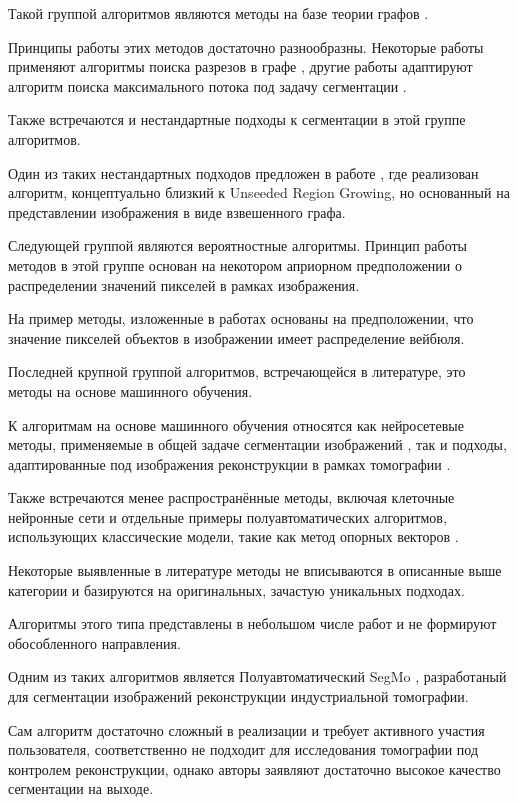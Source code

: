 Такой группой алгоритмов являются методы на базе теории графов \cite{camilus2012review}. 

Принципы работы этих методов достаточно разнообразны. Некоторые работы применяют алгоритмы поиска разрезов в графе \cite{boykov2003computing, peng2019interactive}, другие работы адаптируют алгоритм поиска максимального потока под задачу сегментации \cite{zeng2008topology}.

Также встречаются и нестандартные подходы к сегментации в этой группе алгоритмов.

Один из таких нестандартных подходов предложен в работе \cite{felzenszwalb2004efficient}, где реализован алгоритм, концептуально близкий к Unseeded Region Growing, но основанный на представлении изображения в виде взвешенного графа.

Следующей группой являются вероятностные алгоритмы. Принцип работы методов в этой группе основан на некотором априорном предположении о распределении значений пикселей в рамках изображения.

На пример методы, изложенные в работах \cite{hu2003volumetric, ayed2006unsupervised} основаны на предположении, что значение пикселей объектов в  изображении имеет распределение вейбюля.

Последней крупной группой алгоритмов, встречающейся в литературе, это методы на основе машинного обучения.

К алгоритмам на основе машинного обучения относятся как нейросетевые методы, применяемые в общей задаче сегментации изображений \cite{lu20193d, ха2016свёрточная}, так и подходы, адаптированные под изображения реконструкции в рамках томографии \cite{milletari2016v}. 

Также встречаются менее распространённые методы, включая клеточные нейронные сети \cite{liu2011industrial} и отдельные примеры полуавтоматических алгоритмов, использующих классические модели, такие как метод опорных векторов \cite{lang2022ai, gonella2019semi}.

Некоторые выявленные в литературе методы не вписываются в описанные выше категории и базируются на оригинальных, зачастую уникальных подходах. 

Алгоритмы этого типа представлены в небольшом числе работ и не формируют обособленного направления.

Одним из таких алгоритмов является Полуавтоматический SegMo \cite{nagai2019segmo}, разработаный для сегментации изображений реконструкции индустриальной томографии.

Сам алгоритм достаточно сложный в реализации и требует активного участия пользователя, соответственно не подходит для исследования томографии под контролем реконструкции, однако авторы заявляют достаточно высокое качество сегментации на выходе.

